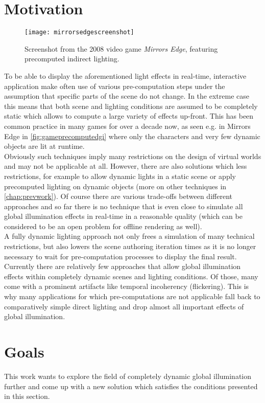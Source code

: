 \documentclass[thesis.tex]{subfiles}
\begin{document}
\section{Motivation}
\begin{figure}[h]
\centering
\texttt{[image: mirrorsedgescreenshot]}
\caption{Screenshot from the 2008 video game \emph{Mirrors Edge}, featuring precomputed indirect lighting.}
\label{fig:gameprecomputedgi}
\end{figure}
To be able to display the aforementioned light effects in real-time, interactive application make often use of various pre-computation steps under the assumption that specific parts of the scene do not change.
In the extreme case this means that both scene and lighting conditions are assumed to be completely static which allows to compute a large variety of effects up-front.
This has been common practice in many games for over a decade now, as seen e.g. in Mirrors Edge in \autoref{fig:gameprecomputedgi} where only the characters and very few dynamic objects are lit at runtime.
\\
Obviously such techniques imply many restrictions on the design of virtual worlds and may not be applicable at all.
However, there are also solutions which less restrictions, for example to allow dynamic lights in a static scene or apply precomputed lighting on dynamic objects (more on other techniques in \autoref{chap:prevwork}).
Of course there are various trade-offs between different approaches and so far there is no technique that is even close to simulate all global illumination effects in real-time in a reasonable quality (which can be considered to be an open problem for offline rendering as well).
\\
A fully dynamic lighting approach not only frees a simulation of many technical restrictions, but also lowers the scene authoring iteration times as it is no longer necessary to wait for pre-computation processes to display the final result.
Currently there are relatively few approaches that allow global illumination effects within completely dynamic scenes and lighting conditions.
Of those, many come with a prominent artifacts like temporal incoherency (flickering).
This is why many applications for which pre-computations are not applicable fall back to comparatively simple direct lighting and drop almost all important effects of global illumination.

\section{Goals} \label{bib:goals}
This work wants to explore the field of completely dynamic global illumination further and come up with a new solution which satisfies the conditions presented in this section.
\end{document}
